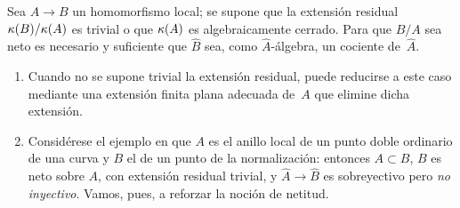 \begin{proposition}
\label{I.3.7}
Sea $A\to B$ un homomorfismo local; se supone que la extensión residual $\kappa(B)/\kappa(A)$ es trivial o que $\kappa(A)$ es algebraicamente cerrado. Para que $B/A$ sea neto es necesario y suficiente que $\widehat{B}$ sea, como $\widehat{A}$-álgebra, un cociente de~$\widehat{A}$.
\end{proposition}

\begin{remarquesstar}
\begin{enumerate}
\item[--] Cuando no se supone trivial la extensión residual, puede reducirse a este caso mediante una extensión finita plana adecuada de~$A$ que elimine dicha extensión.
\item[--] Considérese el ejemplo en que $A$ es el anillo local de un punto doble ordinario de una curva y $B$ el de un punto de la normalización: entonces $A\subset B$, $B$ es neto sobre
$A$, con extensión residual trivial, y $\widehat{A}\to\widehat{B}$ es sobreyectivo pero \emph{no inyectivo}. Vamos, pues, a reforzar la noción de netitud.
\end{enumerate}
\end{remarquesstar}


